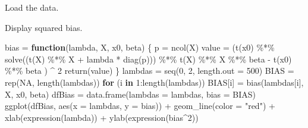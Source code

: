 \documentclass[
]{article}
\newenvironment{Shaded}{\begin{snugshade}}{\end{snugshade}}
\newcommand{\AttributeTok}[1]{\textcolor[rgb]{0.77,0.63,0.00}{#1}}
\newcommand{\CommentTok}[1]{\textcolor[rgb]{0.56,0.35,0.01}{\textit{#1}}}
\newcommand{\ConstantTok}[1]{\textcolor[rgb]{0.00,0.00,0.00}{#1}}
\newcommand{\ControlFlowTok}[1]{\textcolor[rgb]{0.13,0.29,0.53}{\textbf{#1}}}
\newcommand{\DecValTok}[1]{\textcolor[rgb]{0.00,0.00,0.81}{#1}}
\newcommand{\FunctionTok}[1]{\textcolor[rgb]{0.00,0.00,0.00}{#1}}
\newcommand{\NormalTok}[1]{#1}
\newcommand{\OtherTok}[1]{\textcolor[rgb]{0.56,0.35,0.01}{#1}}
\newcommand{\SpecialCharTok}[1]{\textcolor[rgb]{0.00,0.00,0.00}{#1}}
\newcommand{\StringTok}[1]{\textcolor[rgb]{0.31,0.60,0.02}{#1}}
\begin{document}
Load the data.

\begin{Shaded}
\end{Shaded}

Display squared bias.

\begin{Shaded}
\begin{Highlighting}[]
\NormalTok{bias }\OtherTok{=} \ControlFlowTok{function}\NormalTok{(lambda, X, x0, beta) \{}
\NormalTok{  p }\OtherTok{=} \FunctionTok{ncol}\NormalTok{(X)}
\NormalTok{  value }\OtherTok{=}\NormalTok{ (}\FunctionTok{t}\NormalTok{(x0) }\SpecialCharTok{\%*\%} \FunctionTok{solve}\NormalTok{((}\FunctionTok{t}\NormalTok{(X) }\SpecialCharTok{\%*\%}\NormalTok{ X }\SpecialCharTok{+}\NormalTok{ lambda }\SpecialCharTok{*} \FunctionTok{diag}\NormalTok{(p))) }\SpecialCharTok{\%*\%} \FunctionTok{t}\NormalTok{(X) }\SpecialCharTok{\%*\%}\NormalTok{ X }\SpecialCharTok{\%*\%}\NormalTok{ beta }\SpecialCharTok{{-}} \FunctionTok{t}\NormalTok{(x0) }\SpecialCharTok{\%*\%}\NormalTok{ beta ) }\SpecialCharTok{\^{}} \DecValTok{2}
  \FunctionTok{return}\NormalTok{(value)}
\NormalTok{\}}
\NormalTok{lambdas }\OtherTok{=} \FunctionTok{seq}\NormalTok{(}\DecValTok{0}\NormalTok{, }\DecValTok{2}\NormalTok{, }\AttributeTok{length.out =} \DecValTok{500}\NormalTok{)}
\NormalTok{BIAS }\OtherTok{=} \FunctionTok{rep}\NormalTok{(}\ConstantTok{NA}\NormalTok{, }\FunctionTok{length}\NormalTok{(lambdas))}
\ControlFlowTok{for}\NormalTok{ (i }\ControlFlowTok{in} \DecValTok{1}\SpecialCharTok{:}\FunctionTok{length}\NormalTok{(lambdas)) BIAS[i] }\OtherTok{=} \FunctionTok{bias}\NormalTok{(lambdas[i], X, x0, beta)}
\NormalTok{dfBias }\OtherTok{=} \FunctionTok{data.frame}\NormalTok{(}\AttributeTok{lambdas =}\NormalTok{ lambdas, }\AttributeTok{bias =}\NormalTok{ BIAS)}
\FunctionTok{ggplot}\NormalTok{(dfBias, }\FunctionTok{aes}\NormalTok{(}\AttributeTok{x =}\NormalTok{ lambdas, }\AttributeTok{y =}\NormalTok{ bias)) }\SpecialCharTok{+} \FunctionTok{geom\_line}\NormalTok{(}\AttributeTok{color =} \StringTok{"red"}\NormalTok{) }\SpecialCharTok{+} \FunctionTok{xlab}\NormalTok{(}\FunctionTok{expression}\NormalTok{(lambda)) }\SpecialCharTok{+}
  \FunctionTok{ylab}\NormalTok{(}\FunctionTok{expression}\NormalTok{(bias}\SpecialCharTok{\^{}}\DecValTok{2}\NormalTok{))}
\end{Highlighting}
\end{Shaded}
\end{document}
